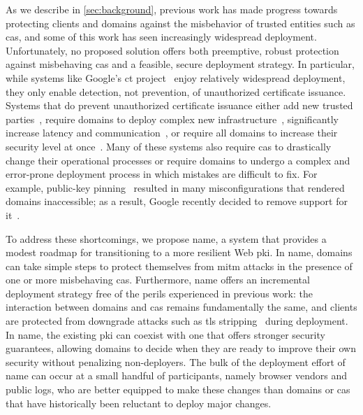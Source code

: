 As we describe in \autoref{sec:background}, previous work has made progress
towards protecting clients and domains against the misbehavior of trusted
entities such as \acp{ca}, and some of this work has seen increasingly
widespread deployment. Unfortunately, no proposed solution offers both
preemptive, robust protection against misbehaving \acp{ca} and a feasible,
secure deployment strategy. In particular, while systems like Google's \ac{ct}
project~\cite{rfc6962} enjoy relatively widespread deployment, they only enable
detection, not prevention, of unauthorized certificate issuance. Systems that do
prevent unauthorized certificate issuance either add new trusted
parties~\cite{kim2013accountable}, require domains to deploy complex new
infrastructure~\cite{rfc6698, szalachowski2014policert}, significantly increase
latency and communication~\cite{yu2016dtki}, or require all domains to increase
their security level at once~\cite{basin2014arpki}. Many of these systems also
require \acp{ca} to drastically change their operational processes or require
domains to undergo a complex and error-prone deployment process in which
mistakes are difficult to fix. For example, public-key pinning~\cite{rfc7469}
resulted in many misconfigurations that rendered domains inaccessible; as a result,
Google recently decided to remove support for it~\cite{palmer2017intent}.

To address these shortcomings, we propose \ac{name}, a system that provides a
modest roadmap for transitioning to a more resilient Web \ac{pki}. In \ac{name},
domains can take simple steps to protect themselves from \ac{mitm} attacks in
the presence of one or more misbehaving \acp{ca}. Furthermore, \ac{name} offers
an incremental  deployment strategy free of the perils experienced in previous
work: the interaction between domains and \acp{ca} remains fundamentally the
same, and clients are protected from downgrade attacks such as \ac{tls}
stripping~\cite{marlinspike2009new} during deployment. In \ac{name}, the
existing \ac{pki} can coexist with one that offers stronger security guarantees,
allowing domains to decide when they are ready to improve their own security
without penalizing non-deployers. The bulk of the deployment effort of \ac{name}
can occur at a small handful of participants, namely browser vendors and public
logs, who are better equipped to make these changes than domains or \acp{ca}
that have historically been reluctant to deploy major changes.

